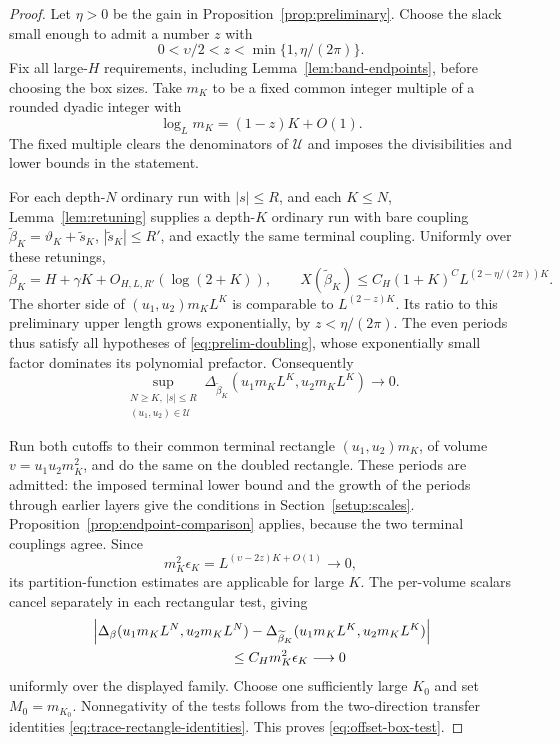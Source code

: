 \begin{proof}
Let $\eta>0$ be the gain in Proposition~\ref{prop:preliminary}.
Choose the slack small enough to admit a number $z$ with
\begin{equation}
 0<\upsilon/2<z<\min\{1,\eta/(2\pi)\}.
 \label{eq:offset-box-exponents}
\end{equation}
Fix all large-$H$ requirements, including
Lemma~\ref{lem:band-endpoints}, before choosing the box sizes.
Take $m_K$ to be a fixed common integer multiple of a rounded
dyadic integer with
\[
 \log_L m_K=(1-z)K+O(1).
\]
The fixed multiple clears the denominators of $\mathcal U$ and
imposes the divisibilities and lower bounds in the statement.

For each depth-$N$ ordinary run with $|s|\le R$, and each $K\le N$,
Lemma~\ref{lem:retuning} supplies a depth-$K$ ordinary run with
bare coupling $\widetilde\beta_K=\vartheta_K+\widetilde s_K$,
$|\widetilde s_K|\le R'$, and exactly the same terminal coupling.
Uniformly over these retunings,
\[
 \widetilde\beta_K=H+\gamma K+O_{H,L,R'}(\log(2+K)),\qquad
 X(\widetilde\beta_K)
 \le C_H(1+K)^C L^{(2-\eta/(2\pi))K}.
\]
The shorter side of $(u_1,u_2)m_KL^K$ is comparable to
$L^{(2-z)K}$.  Its ratio to this preliminary upper length grows
exponentially, by $z<\eta/(2\pi)$.  The even periods thus satisfy
all hypotheses of \eqref{eq:prelim-doubling}, whose exponentially
small factor dominates its polynomial prefactor.  Consequently
\[
 \sup_{\substack{N\ge K,\ |s|\le R\\(u_1,u_2)\in\mathcal U}}
 \Delta_{\widetilde\beta_K}(u_1m_KL^K,u_2m_KL^K)
       \longrightarrow0.
\]

Run both cutoffs to their common terminal rectangle
$(u_1,u_2)m_K$, of volume $v=u_1u_2m_K^2$, and do the same on
the doubled rectangle.  These periods are admitted: the imposed
terminal lower bound and the growth of the periods through earlier
layers give the conditions in Section~\ref{setup:scales}.
Proposition~\ref{prop:endpoint-comparison} applies, because the two
terminal couplings agree.  Since
\[
 m_K^2\epsilon_K
 =L^{(\upsilon-2z)K+O(1)}\longrightarrow0,
\]
its partition-function estimates are applicable for large $K$.
The per-volume scalars cancel separately in each rectangular test,
giving
\begin{align*}
 &\left|\Delta_{\beta}(u_1m_KL^N,u_2m_KL^N)
       -\Delta_{\widetilde\beta_K}(u_1m_KL^K,u_2m_KL^K)\right|\\
 &\hspace{35mm}\le C_Hm_K^2\epsilon_K\longrightarrow0
\end{align*}
uniformly over the displayed family.  Choose one sufficiently large
$K_0$ and set $M_0=m_{K_0}$.  Nonnegativity of the tests follows
from the two-direction transfer identities
\eqref{eq:trace-rectangle-identities}.  This proves
\eqref{eq:offset-box-test}.
\end{proof}

